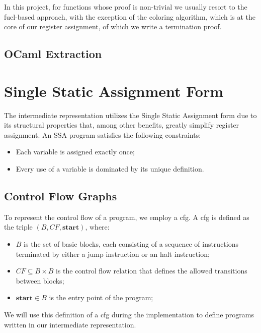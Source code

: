In this project, for functions whose proof is non-trivial we usually resort to the fuel-based approach, with the exception of the coloring algorithm, which is at the core of our register assignment, of which we write a termination proof.

\subsection{OCaml Extraction}
\label{subsec:extract}

\section{Single Static Assignment Form}
\label{sec:ssa}

The intermediate representation utilizes the Single Static Assignment form due to its structural properties that, among other benefits, greatly simplify register assignment. An SSA program satisfies the following constraints:

\begin{itemize}
    \item Each variable is assigned exactly once;
    \item Every use of a variable is dominated by its unique definition.
\end{itemize}

\subsection{Control Flow Graphs}
\label{subsec:cfg}

To represent the control flow of a program, we employ a \gls{cfg}. A \gls{cfg} is defined as the triple $(B, CF, \textbf{start})$, where:

\begin{itemize}
    \item $B$ is the set of basic blocks, each consisting of a sequence of instructions terminated by either a jump instruction or an halt instruction;
    \item $CF \subseteq B \times B$ is the control flow relation that defines the allowed transitions between blocks;
    \item $\textbf{start} \in B$ is the entry point of the program;
\end{itemize}

We will use this definition of a \gls{cfg} during the implementation to define programs written in our intermediate representation.

